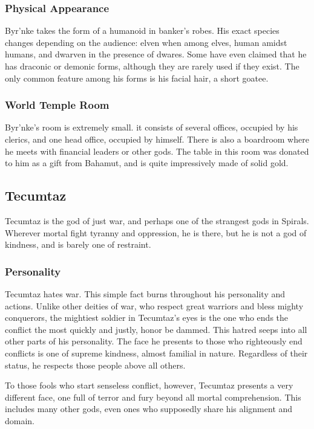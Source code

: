 \subsubsection*{Physical Appearance}
Byr'nke takes the form of a humanoid in banker's robes.
His exact species changes depending on the audience: elven when among elves, human amidst humans, and dwarven in the presence of dwares.
Some have even claimed that he has draconic or demonic forms, although they are rarely used if they exist.
The only common feature among his forms is his facial hair, a short goatee.

\subsubsection*{World Temple Room}
Byr'nke's room is extremely small.
it consists of several offices, occupied by his clerics, and one head office, occupied by himself.
There is also a boardroom where he meets with financial leaders or other gods.
The table in this room was donated to him as a gift from Bahamut, and is quite impressively made of solid gold.

\subsection*{Tecumtaz}
\begin{goddesc}
\end{goddesc}
Tecumtaz is the god of just war, and perhaps one of the strangest gods in Spirals.
Wherever mortal fight tyranny and oppression, he is there, but he is not a god of kindness, and is barely one of restraint.

\subsubsection*{Personality}
Tecumtaz hates war.
This simple fact burns throughout his personality and actions.
Unlike other deities of war, who respect great warriors and bless mighty conquerors, the mightiest soldier in Tecumtaz's eyes is the one who ends the conflict the most quickly and justly, honor be dammed.
This hatred seeps into all other parts of his personality.
The face he presents to those who righteously end conflicts is one of supreme kindness, almost familial in nature.
Regardless of their status, he respects those people above all others.

To those fools who start senseless conflict, however, Tecumtaz presents a very different face, one full of terror and fury beyond all mortal comprehension.
This includes many other gods, even ones who supposedly share his alignment and domain.

